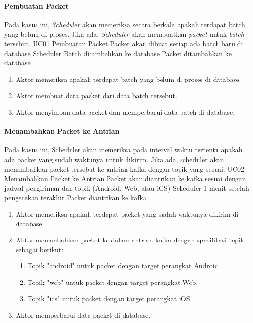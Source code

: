 \paragraph{Pembuatan Packet}
\par Pada kasus ini, \textit{Scheduler} akan memeriksa secara berkala apakah terdapat batch yang belum di proses.
Jika ada, \textit{Scheduler} akan membuatkan \textit{packet} untuk \textit{batch} tersebut.
\tableUcDesc
{UC01}
{Pembuatan Packet}
{Packet akan dibuat setiap ada batch baru di database}
{Scheduler}
{Batch ditambahkan ke database}
{Packet ditambahkan ke database}
{
\begin{enumerate}
    \item Aktor memeriksa apakah terdapat batch yang belum di proses di database.
    \item Aktor membuat data packet dari data batch tersebut.
    \item Aktor menyimpan data packet dan memperbarui data batch di database.
\end{enumerate}
}

\paragraph{Menambahkan Packet ke Antrian}
\par Pada kasus ini, Scheduler akan memeriksa pada interval waktu tertentu apakah ada packet yang sudah waktunya untuk
dikirim.
Jika ada, scheduler akan menambahkan packet tersebut ke antrian kafka dengan topik yang sesuai.
\tableUcDesc
{UC02}
{Menambahkan Packet ke Antrian}
{Packet akan diantrikan ke kafka sesuai dengan jadwal pengiriman dan topik (Android, Web, atau iOS)}
{Scheduler}
{1 menit setelah pengecekan terakhir}
{Packet diantrikan ke kafka}
{
\begin{enumerate}
    \item Aktor memeriksa apakah terdapat packet yang sudah waktunya dikirim di database.
    \item Aktor menambahkan packet ke dalam antrian kafka dengan spesifikasi topik sebagai berikut:
    \begin{enumerate}
        \item Topik "android" untuk packet dengan target perangkat Android.
        \item Topik "web" untuk packet dengan target perangkat Web.
        \item Topik "ios" untuk packet dengan target perangkat iOS.
    \end{enumerate}
    \item Aktor memperbarui data packet di database.
\end{enumerate}
}

